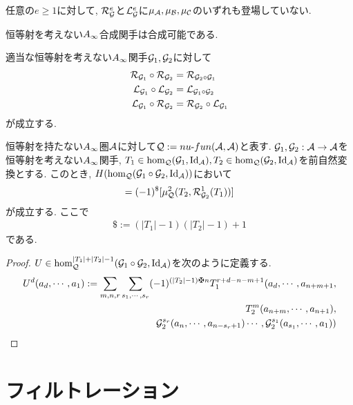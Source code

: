 \documentclass[uplatex, a4paper, 14Q, dvipdfmx]{jsarticle}
\begin{document}
\begin{remark}
  任意の$e \geq 1$に対して, $\mathcal{R}_{\mathcal{G}}^e$と$\mathcal{L}_{\mathcal{G}}^e$に$\mu_{\mathcal{A}}, \mu_{\mathcal{B}}, \mu_{\mathcal{C}}$のいずれも登場していない. 
\end{remark}

恒等射を考えない$A_{\infty}$合成関手は合成可能である. 

\begin{lemma}
  適当な恒等射を考えない$A_{\infty}$関手$\mathcal{G}_1,\mathcal{G}_2$に対して
  \begin{align*}
    \mathcal{R}_{\mathcal{G}_1} \circ \mathcal{R}_{\mathcal{G}_2} &= \mathcal{R}_{\mathcal{G}_2 \circ \mathcal{G}_1} \\
    \mathcal{L}_{\mathcal{G}_1} \circ \mathcal{L}_{\mathcal{G}_2} &= \mathcal{L}_{\mathcal{G}_1 \circ \mathcal{G}_2} \\
    \mathcal{L}_{\mathcal{G}_1} \circ \mathcal{R}_{\mathcal{G}_2} &= \mathcal{R}_{\mathcal{G}_2} \circ \mathcal{L}_{\mathcal{G}_1}
  \end{align*}
  が成立する. 
\end{lemma}

\begin{lemma}
  恒等射を持たない$A_{\infty}$圏$\mathcal{A}$に対して$\mathcal{Q} := nu \text{-} fun (\mathcal{A}, \mathcal{A})$と表す. 
  $\mathcal{G}_1, \mathcal{G}_2 : \mathcal{A} \to \mathcal{A}$を恒等射を考えない$A_{\infty}$関手, $T_1 \in \hom_{\mathcal{Q}}(\mathcal{G}_1,\mathrm{Id}_{\mathcal{A}}), T_2 \in \hom_{\mathcal{Q}}(\mathcal{G}_2,\mathrm{Id}_{\mathcal{A}})$を前自然変換とする. 
  このとき, $H(\hom_{\mathcal{Q}}(\mathcal{G}_1 \circ \mathcal{G}_2, \mathrm{Id}_{\mathcal{A}}))$において
  \begin{align*}
    [\mu^2_\Q(T_1,\L^1_{\G_1}(T_2))]
    = (-1)^\$ [\mu^2_\Q(T_2,\R^1_{\G_2}(T_1))]
  \end{align*}
  が成立する.
  ここで
  \begin{align*}
    \$ := (|T_1|-1)(|T_2|-1) + 1
  \end{align*}
  である. 
\end{lemma}

\begin{proof}
  $U \in \hom^{|T_1|+|T_2|-1}_{\mathcal{Q}} (\mathcal{G}_1 \circ \mathcal{G}_2, \mathrm{Id}_{\mathcal{A}})$を次のように定義する.
  \begin{align*}
    U^d(a_d,\cdots,a_1)
    := \sum_{m,n,r} \sum_{s_1,\cdots,s_r} (-1)^{(|T_2|-1) \maltese n} 
    T_1^{r+d-n-m+1} (a_d,\cdots,a_{n+m+1}, \\
    T_2^m(a_{n+m},\cdots,a_{n+1}), \\
    \G_2^{s_r}(a_n,\cdots,a_{n-s_r+1}) \cdots, \G_2^{s_1}(a_{s_1},\cdots,a_1))
  \end{align*}
\end{proof}

\section{フィルトレーション}
\end{document}
